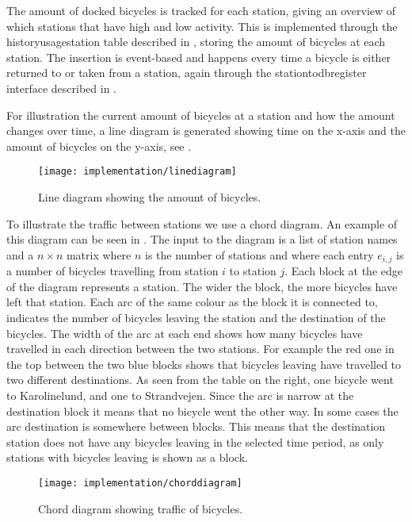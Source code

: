 The amount of docked bicycles is tracked for each station, giving an overview of which stations that have high and low activity.
This is implemented through the historyusagestation table described in , storing the amount of bicycles at each station.
The insertion is event-based and happens every time a bicycle is either returned to or taken from a station, again through the stationtodbregister interface described in .

For illustration the current amount of bicycles at a station and how the amount changes over time, a line diagram is generated showing time on the x-axis and the amount of bicycles on the y-axis, see .
\begin{figure}[h]
\texttt{[image: implementation/linediagram]}
\caption{Line diagram showing the amount of bicycles.}\label{fig:linediagram}
\end{figure}

To illustrate the traffic between stations we use a chord diagram. 
An example of this diagram can be seen in . 
The input to the diagram is a list of station names and a $n \times n$ matrix where $n$ is the number of stations and where each entry $e_{i,j}$ is a number of bicycles travelling from station $i$ to station $j$. 
Each block at the edge of the diagram represents a station. 
The wider the block, the more bicycles have left that station. 
Each arc of the same colour as the block it is connected to, indicates the number of bicycles leaving the station and the destination of the bicycles. 
The width of the arc at each end shows how many bicycles have travelled in each direction between the two stations. 
For example the red one in the top between the two blue blocks shows that bicycles leaving have travelled to two different destinations. 
As seen from the table on the right, one bicycle went to Karolinelund, and one to Strandvejen. 
Since the arc is narrow at the destination block it means that no bicycle went the other way. 
In some cases the arc destination is somewhere between blocks. 
This means that the destination station does not have any bicycles leaving in the selected time period, as only stations with bicycles leaving is shown as a block.
\begin{figure}[h]
\texttt{[image: implementation/chorddiagram]}
\caption{Chord diagram showing traffic of bicycles.}\label{fig:chorddiagram}
\end{figure}


